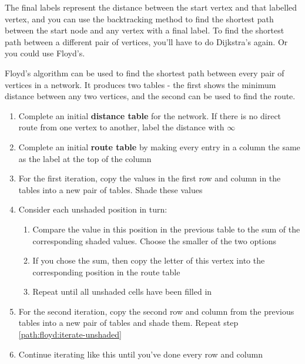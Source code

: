 \documentclass[../main.tex]{subfile}
\begin{document}
The final labels represent the distance between the start vertex and that labelled vertex, and you can use the backtracking method to find the shortest path between the start node and any vertex with a final label. To find the shortest path between a different pair of vertices, you'll have to do Dijkstra's again. Or you could use Floyd's.


Floyd's algorithm can be used to find the shortest path between every pair of vertices in a network. It produces two tables - the first shows the minimum distance between any two vertices, and the second can be used to find the route.

\begin{enumerate}
	\item Complete an initial \textbf{distance table} for the network. If there is no direct route from one vertex to another, label the distance with $\infty$
	\item Complete an initial \textbf{route table} by making every entry in a column the same as the label at the top of the column
	\item For the first iteration, copy the values in the first row and column in the tables into a new pair of tables. Shade these values
	\item\label{path:floyd:iterate-unshaded} Consider each unshaded position in turn: \begin{enumerate}
		\item Compare the value in this position in the previous table to the sum of the corresponding shaded values. Choose the smaller of the two options
		\item If you chose the sum, then copy the letter of this vertex into the corresponding position in the route table
		\item Repeat until all unshaded cells have been filled in
	\end{enumerate}
	\item For the second iteration, copy the second row and column from the previous tables into a new pair of tables and shade them. Repeat step \ref{path:floyd:iterate-unshaded}
	\item Continue iterating like this until you've done every row and column
\end{enumerate}
\end{document}
